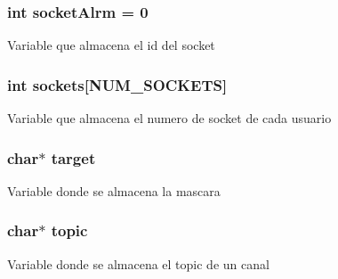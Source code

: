 \subsubsection[{\texorpdfstring{socket\+Alrm}{socketAlrm}}]{\setlength{\rightskip}{0pt plus 5cm}int socket\+Alrm = 0}\hypertarget{_g-2361-06-_p1-_server_8c_a882bc4c5a2b02dd85d4716961c4d902f}{}\label{_g-2361-06-_p1-_server_8c_a882bc4c5a2b02dd85d4716961c4d902f}
Variable que almacena el id del socket 
\subsubsection[{\texorpdfstring{sockets}{sockets}}]{\setlength{\rightskip}{0pt plus 5cm}int sockets\mbox{[}{\bf N\+U\+M\+\_\+\+S\+O\+C\+K\+E\+TS}\mbox{]}}\hypertarget{_g-2361-06-_p1-_server_8c_a7724e53f22e431d1ecb6516951a172e1}{}\label{_g-2361-06-_p1-_server_8c_a7724e53f22e431d1ecb6516951a172e1}
Variable que almacena el numero de socket de cada usuario 
\subsubsection[{\texorpdfstring{target}{target}}]{\setlength{\rightskip}{0pt plus 5cm}char$\ast$ target}\hypertarget{_g-2361-06-_p1-_server_8c_a23b26cdb3a71f525caf03b57f68d47fa}{}\label{_g-2361-06-_p1-_server_8c_a23b26cdb3a71f525caf03b57f68d47fa}
Variable donde se almacena la mascara 
\subsubsection[{\texorpdfstring{topic}{topic}}]{\setlength{\rightskip}{0pt plus 5cm}char$\ast$ topic}\hypertarget{_g-2361-06-_p1-_server_8c_affecb48e716753e10b44feac31f12529}{}\label{_g-2361-06-_p1-_server_8c_affecb48e716753e10b44feac31f12529}
Variable donde se almacena el topic de un canal 
